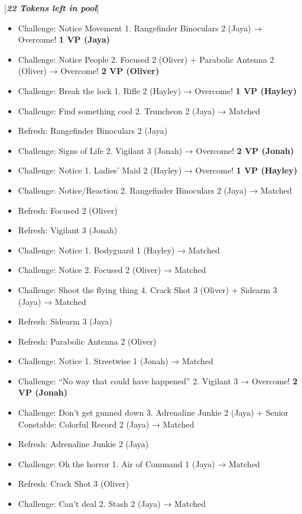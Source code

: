 {[}\textit{\textbf{22 Tokens left in pool}}{]}


{
\parskip=0pt

\begin{itemize}
\item Challenge: Notice Movement 1.  Rangefinder Binoculars 2 (Jaya) → Overcome! \textbf{1 VP (Jaya)}
\item Challenge: Notice People 2.  Focused 2 (Oliver) + Parabolic Antenna 2 (Oliver) → Overcome! \textbf{2 VP (Oliver)}
\item Challenge: Break the lock 1.  Rifle 2 (Hayley) → Overcome! \textbf{1 VP (Hayley)}
\item Challenge: Find something cool 2. Truncheon 2 (Jaya) →  Matched
\item Refresh: Rangefinder Binoculars 2 (Jaya)
\item Challenge: Signs of Life 2.  Vigilant 3 (Jonah) → Overcome! \textbf{2 VP (Jonah)}
\item Challenge: Notice 1.  Ladies' Maid 2 (Hayley) → Overcome! \textbf{1 VP (Hayley)}
\item Challenge: Notice/Reaction 2.  Rangefinder Binoculars 2 (Jaya) → Matched
\item Refresh: Focused 2 (Oliver)
\item Refresh: Vigilant 3 (Jonah)
\item Challenge: Notice 1. Bodyguard 1 (Hayley) → Matched
\item Challenge: Notice 2. Focused 2 (Oliver) → Matched
\item Challenge: Shoot the flying thing 4.  Crack Shot 3 (Oliver) + Sidearm 3 (Jaya) → Matched
\item Refresh: Sidearm 3 (Jaya)
\item Refresh: Parabolic Antenna 2 (Oliver)
\item Challenge: Notice 1. Streetwise 1 (Jonah) → Matched
\item Challenge: ``No way that could have happened'' 2. Vigilant 3 → Overcome! \textbf{2 VP (Jonah)}
\item Challenge: Don't get gunned down 3. Adrenaline Junkie 2 (Jaya) + Senior Constable: Colorful Record 2 (Jaya) → Matched
\item Refresh: Adrenaline Junkie 2 (Jaya)
\item Challenge: Oh the horror 1.  Air of Command 1 (Jaya) → Matched
\item Refresh: Crack Shot 3 (Oliver)
\item Challenge: Can't deal 2.  Stash 2 (Jaya) → Matched

\end{itemize}}
